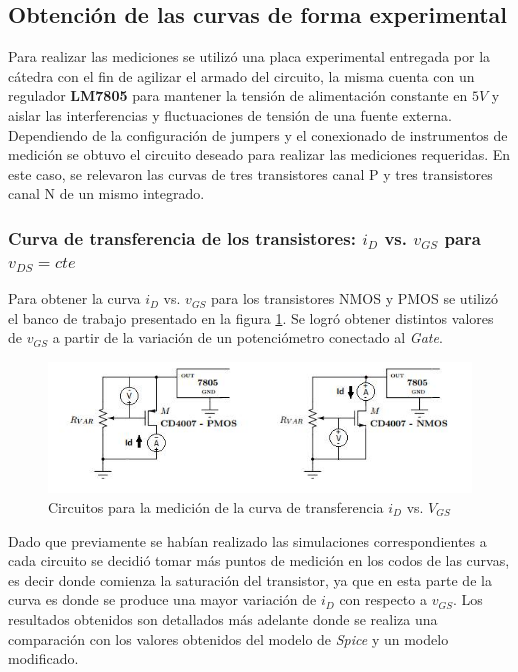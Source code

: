 \documentclass[10pt,spanish,a4paper,openany,notitlepage]{article}
\begin{document}
\subsection{Obtención de las curvas de forma experimental}

Para realizar las mediciones se utilizó una placa experimental entregada por la cátedra con el fin de agilizar el armado del circuito, la misma cuenta con un regulador \textbf{LM7805} para mantener la tensión de alimentación constante en $5\unit{V}$ y aislar las interferencias y fluctuaciones de tensión de una fuente externa.
Dependiendo de la configuración de jumpers y el conexionado de instrumentos de medición se obtuvo el circuito deseado para realizar las mediciones requeridas. En este caso, se relevaron las curvas de tres transistores canal P y tres transistores canal N de un mismo integrado.

\subsubsection{Curva de transferencia de los transistores: $i_D$ vs. $v_{GS}$ para $v_{DS} = cte$}

Para obtener la curva $i_D$ vs. $v_{GS}$ para los transistores NMOS y PMOS se utilizó el banco de trabajo presentado en la figura \ref{fig:banco_vg}.  Se logró obtener distintos valores de $v_{GS}$ a partir de la variación de un potenciómetro conectado al \emph{Gate}.


\begin{figure}[H] %
\begin{center}
\includegraphics[scale=0.7]{./Imagenes/banco_vg.jpg}
\caption{Circuitos para la medición de la curva de transferencia $i_D$ vs. $V_{GS}$}
 \label{fig:banco_vg}
\end{center}
\end{figure}

Dado que previamente se habían realizado las simulaciones correspondientes a cada circuito se decidió tomar más puntos de medición en los codos de las curvas, es decir donde comienza la saturación del transistor, ya que en esta parte de la curva es donde se produce una mayor variación de $i_D$ con respecto a $v_{GS}$.
Los resultados obtenidos son detallados más adelante donde se realiza una comparación con los valores obtenidos del modelo de \emph{Spice} y un modelo modificado.
\end{document}
